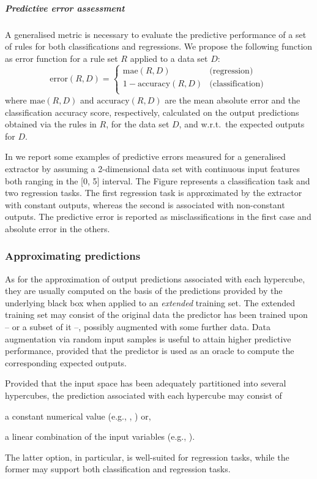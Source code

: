 \documentclass[
]{ceurart}
\begin{document}
\subparagraph{Predictive error assessment}

A generalised metric is necessary to evaluate the predictive performance of a set of rules for both classifications and regressions.
%
We propose the following function as error function for a rule set $R$ applied to a data set $D$:
%
\begin{equation}\label{eq:error}
	\text{error}(R, D) = 
	\begin{cases}
		\text{mae}(R, D) & \text{(regression)}\\
		1 - \text{accuracy}(R, D) & \text{(classification)}\\
	\end{cases}\,
\end{equation}
%
where $\text{mae}(R, D)$ and $\text{accuracy}(R, D)$ are the mean absolute error and the classification accuracy score, respectively, calculated on the output predictions obtained via the rules in $R$, for the data set $D$, and w.r.t.\ the expected outputs for $D$.



In  we report some examples of predictive errors measured for a generalised extractor by assuming a 2-dimensional data set with continuous input features both ranging in the [0, 5] interval.
%
The Figure represents a classification task and two regression tasks.
%
The first regression task is approximated by the extractor with constant outputs, whereas the second is associated with non-constant outputs.
%
The predictive error is reported as misclassifications in the first case and absolute error in the others.
 
\subsubsection{Approximating predictions}

As for the approximation of output predictions associated with each hypercube, they are usually computed on the basis of the predictions provided by the underlying black box when applied to an \emph{extended} training set.
%
The extended training set may consist of the original data the predictor has been trained upon -- or a subset of it --, possibly augmented with some further data.
%
Data augmentation via random input samples is useful to attain higher predictive performance, provided that the predictor is used as an oracle to compute the corresponding expected outputs.

Provided that the input space has been adequately partitioned into several hypercubes, the prediction associated with each hypercube may consist of 
%
\begin{inlinelist}
	\item a constant numerical value (e.g., \iter{}, \gridex{}) or, 
	\item a linear combination of the input variables (e.g., \gridrex{}).
\end{inlinelist}
%
The latter option, in particular, is well-suited for regression tasks, while the former may support both classification and regression tasks.
\end{document}
